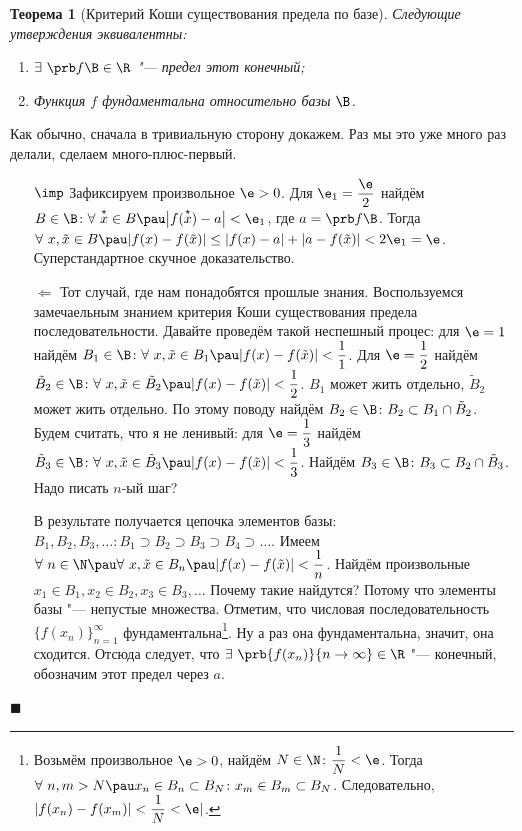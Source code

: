 \documentclass[a4paper,10pt,twoside]{article}
\newtheorem{The}{Теорема}[section]
\newenvironment{Proof}
       {\par\noindent{\textbf{Доказательство.}}}
       {\hfill$\scriptstyle\blacksquare$}
\begin{document}
 \begin{The}[Критерий Коши существования предела по базе]
 	Следующие утверждения эквивалентны:
 	\begin{enumerate}
 	  \item $\exists\ \prb f\B\in\R$ "--- предел этот конечный;
 	  \item Функция $f$ фундаментальна относительно базы $\B$.
 	\end{enumerate}
 \end{The}
 
 \begin{Proof}
 	Как обычно, сначала в тривиальную сторону докажем. Раз мы это уже много раз делали, сделаем много-плюс-первый.
 	\begin{itemize}
 	  \item [$\imp$] Зафиксируем произвольное $\e>0$. Для $\e_1=\dfrac{\e}2$ найдём $B\in\B\colon \forall\  \overset{\star}{x}\in B\pau
 	  \big|f(\overset{\star}{x})-a\big|<\e_1$, где $a=\prb f\B$. Тогда $\forall\  x,\tilde x\in B\pau |f(x)-f(\tilde x)|\leq |f(x)-a|+|a-f(\tilde x)|<2\e_1=\e$.
 	  Суперстандартное скучное доказательство.
 	  \item [$\Leftarrow$] Тот случай, где нам понадобятся прошлые знания. Воспользуемся замечаельным знанием критерия Коши существования предела последовательности.
 	  Давайте проведём такой неспешный процес: для $\e=1$ найдём $B_1\in\B\colon \forall\  x,\tilde x\in B_1\pau |f(x)-f(\tilde x)|<\dfrac11$.
 	  Для $\e=\dfrac12$ найдём $\tilde B_2\in\B\colon \forall\  x,\tilde x\in \tilde B_2\pau |f(x)-f(\tilde x)|<\dfrac12$.
 	  $B_1$ может жить отдельно, $\tilde B_2$ может жить отдельно. По этому поводу найдём $B_2\in\B\colon B_2\subset B_1\cap \tilde B_2$.
 	  Будем считать, что я не ленивый: для $\e=\dfrac13$ найдём $\tilde B_3\in\B\colon \forall\  x,\tilde x\in \tilde B_3\pau |f(x)-f(\tilde x)|<\dfrac13$.
 	  Найдём $B_3\in\B\colon B_3\subset B_2\cap \tilde B_3$.
 	  Надо писать $n$-ый шаг?
 	  
 	  В результате получается цепочка элементов базы: $B_1,B_2,B_3,\ldots\colon B_1\supset B_2\supset B_3\supset B_4\supset\ldots$.
 	  Имеем $\forall\  n\in\N\pau \forall\  x,\tilde x\in B_n\pau |f(x)-f(\tilde x)|<\dfrac1n$. Найдём произвольные $x_1\in B_1, x_2\in B_2, x_3\in B_3, \ldots$
 	  Почему такие найдутся? Потому что элементы базы "--- непустые множества.
 	  Отметим, что числовая последовательность $\big\{f(x_n)\big\}_{n=1}^\infty$ фундаментальна\footnote{Возьмём
 	  произвольное $\e>0$, найдём $N\in\N\colon\dfrac1N<\e$. Тогда $\forall\  n,m>N \pau x_n\in B_n\subset B_N\colon x_m\in B_m\subset B_N$. 
 	  Следовательно, $|f(x_n)-f(x_m)|<\dfrac1N<\e|$.}.
 	  Ну а раз она фундаментальна, значит, она сходится. Отсюда следует, что $\exists\ \prb{f(x_n)}{n\to\infty}\in\R$ "--- конечный, обозначим этот
 	  предел через $a$.
 	  

\end{itemize}
\end{Proof}
\end{document}
